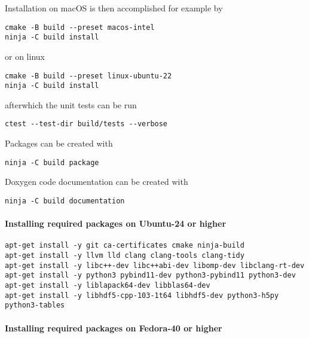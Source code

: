 \noindent
Installation on macOS is then accomplished for example by
\begin{framed}
\begin{verbatim}
cmake -B build --preset macos-intel
ninja -C build install
\end{verbatim}
\end{framed}
or on linux
\begin{framed}
\begin{verbatim}
cmake -B build --preset linux-ubuntu-22
ninja -C build install
\end{verbatim}
\end{framed}
afterwhich the unit tests can be run
\begin{framed}
\begin{verbatim}
ctest --test-dir build/tests --verbose
\end{verbatim}
\end{framed}

\noindent
Packages can be created with
\begin{framed}
\begin{verbatim}
ninja -C build package
\end{verbatim}
\end{framed}

\noindent
Doxygen code documentation can be created with
\begin{framed}
\begin{verbatim}
ninja -C build documentation
\end{verbatim}
\end{framed}

\paragraph{Installing required packages on Ubuntu-24 or higher}

\begin{verbatim}
apt-get install -y git ca-certificates cmake ninja-build
apt-get install -y llvm lld clang clang-tools clang-tidy
apt-get install -y libc++-dev libc++abi-dev libomp-dev libclang-rt-dev
apt-get install -y python3 pybind11-dev python3-pybind11 python3-dev
apt-get install -y liblapack64-dev libblas64-dev
apt-get install -y libhdf5-cpp-103-1t64 libhdf5-dev python3-h5py python3-tables
\end{verbatim}

\paragraph{Installing required packages on Fedora-40 or higher}

